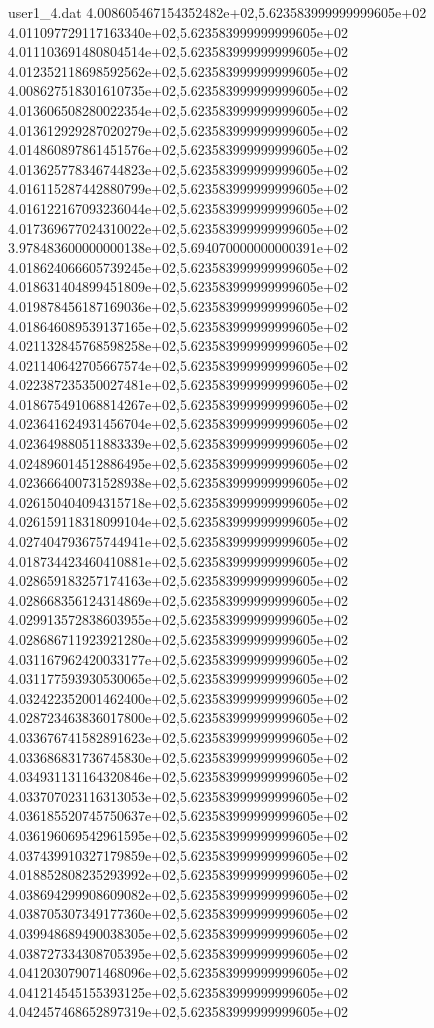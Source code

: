 \begin{filecontents}{user1_4.dat}
4.008605467154352482e+02,5.623583999999999605e+02
4.011097729117163340e+02,5.623583999999999605e+02
4.011103691480804514e+02,5.623583999999999605e+02
4.012352118698592562e+02,5.623583999999999605e+02
4.008627518301610735e+02,5.623583999999999605e+02
4.013606508280022354e+02,5.623583999999999605e+02
4.013612929287020279e+02,5.623583999999999605e+02
4.014860897861451576e+02,5.623583999999999605e+02
4.013625778346744823e+02,5.623583999999999605e+02
4.016115287442880799e+02,5.623583999999999605e+02
4.016122167093236044e+02,5.623583999999999605e+02
4.017369677024310022e+02,5.623583999999999605e+02
3.978483600000000138e+02,5.694070000000000391e+02
4.018624066605739245e+02,5.623583999999999605e+02
4.018631404899451809e+02,5.623583999999999605e+02
4.019878456187169036e+02,5.623583999999999605e+02
4.018646089539137165e+02,5.623583999999999605e+02
4.021132845768598258e+02,5.623583999999999605e+02
4.021140642705667574e+02,5.623583999999999605e+02
4.022387235350027481e+02,5.623583999999999605e+02
4.018675491068814267e+02,5.623583999999999605e+02
4.023641624931456704e+02,5.623583999999999605e+02
4.023649880511883339e+02,5.623583999999999605e+02
4.024896014512886495e+02,5.623583999999999605e+02
4.023666400731528938e+02,5.623583999999999605e+02
4.026150404094315718e+02,5.623583999999999605e+02
4.026159118318099104e+02,5.623583999999999605e+02
4.027404793675744941e+02,5.623583999999999605e+02
4.018734423460410881e+02,5.623583999999999605e+02
4.028659183257174163e+02,5.623583999999999605e+02
4.028668356124314869e+02,5.623583999999999605e+02
4.029913572838603955e+02,5.623583999999999605e+02
4.028686711923921280e+02,5.623583999999999605e+02
4.031167962420033177e+02,5.623583999999999605e+02
4.031177593930530065e+02,5.623583999999999605e+02
4.032422352001462400e+02,5.623583999999999605e+02
4.028723463836017800e+02,5.623583999999999605e+02
4.033676741582891623e+02,5.623583999999999605e+02
4.033686831736745830e+02,5.623583999999999605e+02
4.034931131164320846e+02,5.623583999999999605e+02
4.033707023116313053e+02,5.623583999999999605e+02
4.036185520745750637e+02,5.623583999999999605e+02
4.036196069542961595e+02,5.623583999999999605e+02
4.037439910327179859e+02,5.623583999999999605e+02
4.018852808235293992e+02,5.623583999999999605e+02
4.038694299908609082e+02,5.623583999999999605e+02
4.038705307349177360e+02,5.623583999999999605e+02
4.039948689490038305e+02,5.623583999999999605e+02
4.038727334308705395e+02,5.623583999999999605e+02
4.041203079071468096e+02,5.623583999999999605e+02
4.041214545155393125e+02,5.623583999999999605e+02
4.042457468652897319e+02,5.623583999999999605e+02

\end{filecontents}
